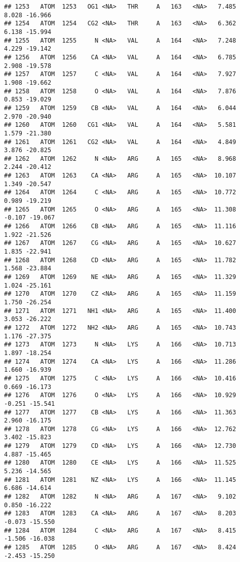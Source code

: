 \documentclass[
]{article}
\begin{document}
\begin{verbatim}
## 1253   ATOM  1253   OG1 <NA>   THR     A   163   <NA>   7.485   8.028 -16.966
## 1254   ATOM  1254   CG2 <NA>   THR     A   163   <NA>   6.362   6.138 -15.994
## 1255   ATOM  1255     N <NA>   VAL     A   164   <NA>   7.248   4.229 -19.142
## 1256   ATOM  1256    CA <NA>   VAL     A   164   <NA>   6.785   2.908 -19.578
## 1257   ATOM  1257     C <NA>   VAL     A   164   <NA>   7.927   1.908 -19.662
## 1258   ATOM  1258     O <NA>   VAL     A   164   <NA>   7.876   0.853 -19.029
## 1259   ATOM  1259    CB <NA>   VAL     A   164   <NA>   6.044   2.970 -20.940
## 1260   ATOM  1260   CG1 <NA>   VAL     A   164   <NA>   5.581   1.579 -21.380
## 1261   ATOM  1261   CG2 <NA>   VAL     A   164   <NA>   4.849   3.876 -20.825
## 1262   ATOM  1262     N <NA>   ARG     A   165   <NA>   8.968   2.244 -20.412
## 1263   ATOM  1263    CA <NA>   ARG     A   165   <NA>  10.107   1.349 -20.547
## 1264   ATOM  1264     C <NA>   ARG     A   165   <NA>  10.772   0.989 -19.219
## 1265   ATOM  1265     O <NA>   ARG     A   165   <NA>  11.308  -0.107 -19.067
## 1266   ATOM  1266    CB <NA>   ARG     A   165   <NA>  11.116   1.922 -21.526
## 1267   ATOM  1267    CG <NA>   ARG     A   165   <NA>  10.627   1.835 -22.941
## 1268   ATOM  1268    CD <NA>   ARG     A   165   <NA>  11.782   1.568 -23.884
## 1269   ATOM  1269    NE <NA>   ARG     A   165   <NA>  11.329   1.024 -25.161
## 1270   ATOM  1270    CZ <NA>   ARG     A   165   <NA>  11.159   1.750 -26.254
## 1271   ATOM  1271   NH1 <NA>   ARG     A   165   <NA>  11.400   3.053 -26.222
## 1272   ATOM  1272   NH2 <NA>   ARG     A   165   <NA>  10.743   1.176 -27.375
## 1273   ATOM  1273     N <NA>   LYS     A   166   <NA>  10.713   1.897 -18.254
## 1274   ATOM  1274    CA <NA>   LYS     A   166   <NA>  11.286   1.660 -16.939
## 1275   ATOM  1275     C <NA>   LYS     A   166   <NA>  10.416   0.669 -16.173
## 1276   ATOM  1276     O <NA>   LYS     A   166   <NA>  10.929  -0.251 -15.541
## 1277   ATOM  1277    CB <NA>   LYS     A   166   <NA>  11.363   2.960 -16.175
## 1278   ATOM  1278    CG <NA>   LYS     A   166   <NA>  12.762   3.402 -15.823
## 1279   ATOM  1279    CD <NA>   LYS     A   166   <NA>  12.730   4.887 -15.465
## 1280   ATOM  1280    CE <NA>   LYS     A   166   <NA>  11.525   5.236 -14.565
## 1281   ATOM  1281    NZ <NA>   LYS     A   166   <NA>  11.145   6.686 -14.614
## 1282   ATOM  1282     N <NA>   ARG     A   167   <NA>   9.102   0.850 -16.222
## 1283   ATOM  1283    CA <NA>   ARG     A   167   <NA>   8.203  -0.073 -15.550
## 1284   ATOM  1284     C <NA>   ARG     A   167   <NA>   8.415  -1.506 -16.038
## 1285   ATOM  1285     O <NA>   ARG     A   167   <NA>   8.424  -2.453 -15.250

\end{verbatim}
\end{document}
